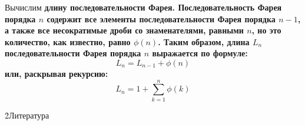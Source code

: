 Вычислим \bf{длину} последовательности Фарея. Последовательность Фарея порядка $n$ содержит все элементы последовательности Фарея порядка $n-1$, а также все несократимые дроби со знаменателями, равными $n$, но это количество, как известно, равно $\phi(n)$. Таким образом, длина $L_n$ последовательности Фарея порядка $n$ выражается по формуле:
$$ L_n = L_{n-1} + \phi(n) $$
или, раскрывая рекурсию:
$$ L_n = 1 + \sum_{k=1}^n \phi(k) $$

\h2{Литература}

\ul{
\li {}
}